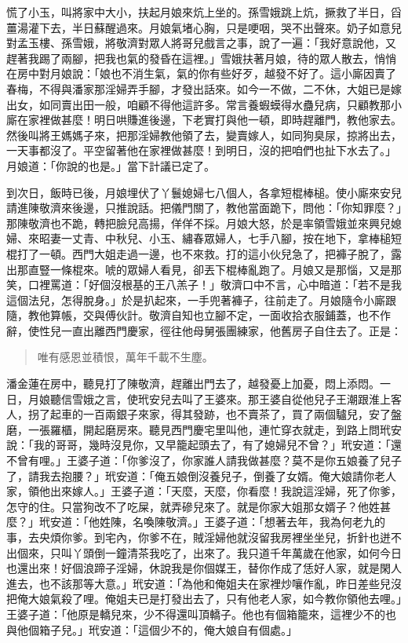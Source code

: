 慌了小玉，叫將家中大小，扶起月娘來炕上坐的。孫雪娥跳上炕，撅救了半日，舀薑湯灌下去，半日蘇醒過來。月娘氣堵心胸，只是哽咽，哭不出聲來。奶子如意兒對孟玉樓、孫雪娥，將敬濟對眾人將哥兒戲言之事，說了一遍：「我好意說他，又趕著我踢了兩腳，把我也氣的發昏在這裡。」雪娥扶著月娘，待的眾人散去，悄悄在房中對月娘說：「娘也不消生氣，氣的你有些好歹，越發不好了。這小廝因賣了春梅，不得與潘家那淫婦弄手腳，才發出話來。如今一不做，二不休，大姐已是嫁出女，如同賣出田一般，咱顧不得他這許多。常言養蝦蟆得水蠱兒病，只顧教那小廝在家裡做甚麼！明日哄賺進後邊，下老實打與他一頓，即時趕離門，教他家去。然後叫將王媽媽子來，把那淫婦教他領了去，變賣嫁人，如同狗臭尿，掠將出去，一天事都沒了。平空留著他在家裡做甚麼！到明日，沒的把咱們也扯下水去了。」月娘道：「你說的也是。」當下計議已定了。

到次日，飯時已後，月娘埋伏了丫鬟媳婦七八個人，各拿短棍棒槌。使小廝來安兒請進陳敬濟來後邊，只推說話。把儀門關了，教他當面跪下，問他：「你知罪麼？」那陳敬濟也不跪，轉把臉兒高揚，佯佯不採。月娘大怒，於是率領雪娥並來興兒媳婦、來昭妻一丈青、中秋兒、小玉、繡春眾婦人，七手八腳，按在地下，拿棒槌短棍打了一頓。西門大姐走過一邊，也不來救。打的這小伙兒急了，把褲子脫了，露出那直豎一條棍來。唬的眾婦人看見，卻丟下棍棒亂跑了。月娘又是那惱，又是那笑，口裡罵道：「好個沒根基的王八羔子！」敬濟口中不言，心中暗道：「若不是我這個法兒，怎得脫身。」於是扒起來，一手兜著褲子，往前走了。月娘隨令小廝跟隨，教他算帳，交與傅伙計。敬濟自知也立腳不定，一面收拾衣服鋪蓋，也不作辭，使性兒一直出離西門慶家，徑往他母舅張團練家，他舊房子自住去了。正是：
\begin{quote}
唯有感恩並積恨，萬年千載不生塵。
\end{quote}

潘金蓮在房中，聽見打了陳敬濟，趕離出門去了，越發憂上加憂，悶上添悶。一日，月娘聽信雪娥之言，使玳安兒去叫了王婆來。那王婆自從他兒子王潮跟淮上客人，拐了起車的一百兩銀子來家，得其發跡，也不賣茶了，買了兩個驢兒，安了盤磨，一張羅櫃，開起磨房來。聽見西門慶宅里叫他，連忙穿衣就走，到路上問玳安說：「我的哥哥，幾時沒見你，又早籠起頭去了，有了媳婦兒不曾？」玳安道：「還不曾有哩。」王婆子道：「你爹沒了，你家誰人請我做甚麼？莫不是你五娘養了兒子了，請我去抱腰？」玳安道：「俺五娘倒沒養兒子，倒養了女婿。俺大娘請你老人家，領他出來嫁人。」王婆子道：「天麼，天麼，你看麼！我說這淫婦，死了你爹，怎守的住。只當狗改不了吃屎，就弄磣兒來了。就是你家大姐那女婿子？他姓甚麼？」玳安道：「他姓陳，名喚陳敬濟。」王婆子道：「想著去年，我為何老九的事，去央煩你爹。到宅內，你爹不在，賊淫婦他就沒留我房裡坐坐兒，折針也迸不出個來，只叫丫頭倒一鐘清茶我吃了，出來了。我只道千年萬歲在他家，如何今日也還出來！好個浪蹄子淫婦，休說我是你個媒王，替你作成了恁好人家，就是閑人進去，也不該那等大意。」玳安道：「為他和俺姐夫在家裡炒嚷作亂，昨日差些兒沒把俺大娘氣殺了哩。俺姐夫已是打發出去了，只有他老人家，如今教你領他去哩。」王婆子道：「他原是轎兒來，少不得還叫頂轎子。他也有個箱籠來，這裡少不的也與他個箱子兒。」玳安道：「這個少不的，俺大娘自有個處。」

